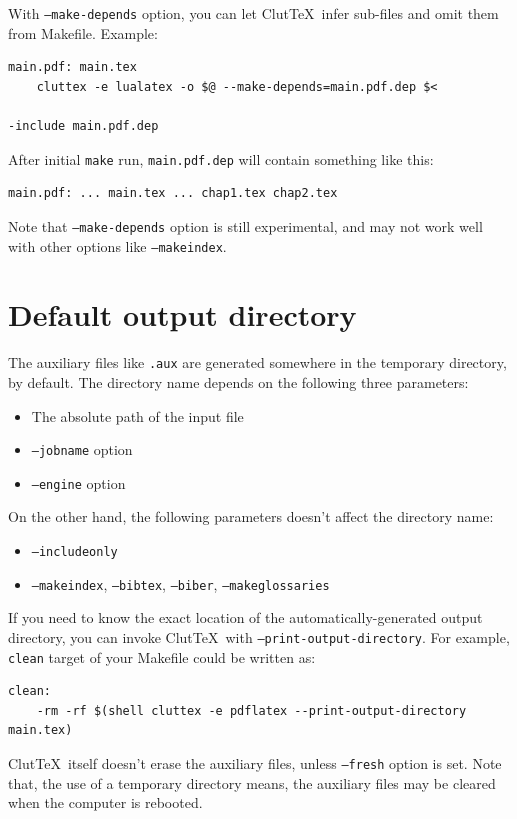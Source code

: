 \documentclass[a4paper]{report}
\newcommand\ClutTeX{Clut\TeX}
\begin{document}
With \texttt{--make-depends} option, you can let \ClutTeX\ infer sub-files and omit them from Makefile.
Example:

\begin{verbatim}
main.pdf: main.tex
    cluttex -e lualatex -o $@ --make-depends=main.pdf.dep $<

-include main.pdf.dep
\end{verbatim}

After initial \texttt{make} run, \texttt{main.pdf.dep} will contain something like this:
\begin{verbatim}
main.pdf: ... main.tex ... chap1.tex chap2.tex
\end{verbatim}

Note that \texttt{--make-depends} option is still experimental, and may not work well with other options like \texttt{--makeindex}.

\section{Default output directory}
The auxiliary files like \texttt{.aux} are generated somewhere in the temporary directory, by default.
The directory name depends on the following three parameters:
\begin{itemize}
\item The absolute path of the input file
\item \texttt{--jobname} option
\item \texttt{--engine} option
\end{itemize}
On the other hand, the following parameters doesn't affect the directory name:
\begin{itemize}
\item \texttt{--includeonly}
\item \texttt{--makeindex}, \texttt{--bibtex}, \texttt{--biber}, \texttt{--makeglossaries}
\end{itemize}

If you need to know the exact location of the automatically-generated output directory, you can invoke \ClutTeX\ with \texttt{--print-output-directory}.
For example, \texttt{clean} target of your Makefile could be written as:
\begin{verbatim}
clean:
    -rm -rf $(shell cluttex -e pdflatex --print-output-directory main.tex)
\end{verbatim}

\ClutTeX\ itself doesn't erase the auxiliary files, unless \texttt{--fresh} option is set.
Note that, the use of a temporary directory means, the auxiliary files may be cleared when the computer is rebooted.
\end{document}
